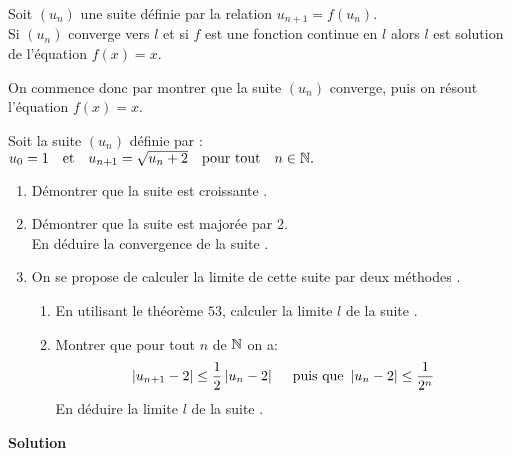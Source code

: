  \begin{theorem}
  Soit $(u_{n})$ une suite définie par la relation  $ u_{n+1}=f(u_{n}) $. \\
   Si $(u_{n})$ converge vers $ l $ et si $ f $ est une fonction continue en $ l $ alors $ l $ est solution de l'équation  $ f(x)=x $.
   \end{theorem}
   \begin{remark}
   On commence donc par  montrer que la suite $(u_{n})$ converge, puis on résout l'équation $ f(x)=x $.
   \end{remark}
   \begin{exercice}
 Soit la suite $(u_{n})$ définie par : \\
 $ u_{0} = 1 \quad \textrm{et}  \quad u_{n+1} = \sqrt{u_{n}+2 }  \quad \textrm{pour tout} \quad  n\in \mathbb{N} .$ 
 \begin{enumerate}
 \item Démontrer que la suite  est croissante .
 \item Démontrer que la suite est majorée par 2. \\
 En déduire la convergence de la suite .
 \item On se propose de calculer la limite de cette suite par deux méthodes .
 \begin{enumerate}
 \item  En utilisant le théorème $ 53 $, calculer la limite $ l $ de la suite .
 \item Montrer que pour tout $ n$ de $ \mathbb{N} $ on a: \[\left\lvert  u_{n+1} -2 \right\rvert
 \leq \frac{1}{2}\left\lvert u_{n}-2 \right\rvert \quad \textrm{ puis que }\left\lvert u_{n}-2 \right\rvert
\leq\frac{1}{2^{n}}\] En déduire la limite $ l $ de la suite .
 \end{enumerate}
\end{enumerate}
\end{exercice}
\textbf{Solution}
